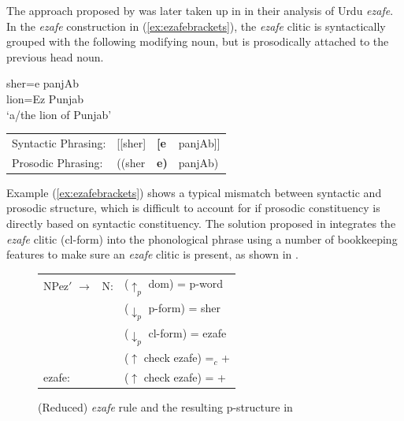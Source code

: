 \documentclass[output=paper,hidelinks]{langscibook}
\begin{document}
\noindent The approach proposed by \citet{buttking98} was later taken up in \citet{BoBuSu08} in their analysis of Urdu {\em ezafe}. In the {\em ezafe} construction in (\ref{ex:ezafebrackets}), the {\em ezafe} clitic is syntactically grouped with the following modifying noun, but is prosodically attached to the previous head noun.

\ea\label{ex:ezafebrackets}
\gll sher=e panjAb\\
lion=Ez  Punjab\\
\glt`a/the lion of Punjab'\\[1ex]
\begin{tabular}[t]{llll}
Syntactic Phrasing:  & [[sher] & {\bf [e} & panjAb]]\\
Prosodic Phrasing: & ((sher & {\bf e)} & panjAb)\\
\end{tabular}
\z

\noindent Example (\ref{ex:ezafebrackets}) shows a typical mismatch
between syntactic and prosodic structure, which is difficult to
account for if prosodic constituency is directly based on syntactic
constituency. The solution proposed in \citet{BoBuSu08} integrates the
{\em ezafe} clitic ({\sc cl-form}) into the phonological phrase using
a number of bookkeeping features to make sure an {\em ezafe} clitic is
present, as shown in .

\begin{figure}
\centering
{\small
\begin{minipage}{0.55\textwidth}
\begin{tabular}[t]{ll}
NPez$'$ $\longrightarrow$ \ N: & ($\uparrow_p$ {\sc dom}) = {\sc p-word}\\
 & ($\downarrow_p$ {\sc p-form}) = sher \\
 & ($\downarrow_p$ {\sc cl-form}) = ezafe \\
 &($\uparrow$ {\sc check} {\sc ezafe}) =$_c$ + \\[2ex]
 ezafe: & ($\uparrow$ {\sc check} {\sc ezafe}) = +
\end{tabular}
\label{npezbar}
\end{minipage}
\begin{minipage}{0.4\textwidth}
{\footnotesize
{}
}

\end{minipage}
}
\caption{(Reduced) {\em ezafe} rule and the resulting p-structure in \citet{BoBuSu08}}
\label{fig:ezafe}
\end{figure}
\end{document}
